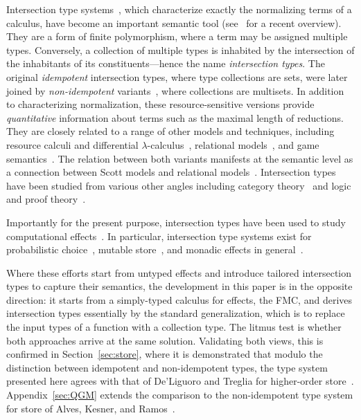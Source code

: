 \documentclass[a4paper,UKenglish,cleveref, autoref, thm-restate]{lipics-v2021}
\begin{document}
Intersection type systems~\cite{Coppo-Dezani-1980,Pottinger-1980}, which characterize exactly the normalizing terms of a calculus, have become an important semantic tool (see~\cite{Bono-Dezani-2020} for a recent overview). They are a form of finite polymorphism, where a term may be assigned multiple types. Conversely, a collection of multiple types is inhabited by the intersection of the inhabitants of its constituents---hence the name \emph{intersection types}. The original \emph{idempotent} intersection types, where type collections are sets, were later joined by \emph{non-idempotent} variants~\cite{Bucciarelli-Kesner-Ventura-2017,Kfoury-Wells-1999,Neergaard-Mairson-2004}, where collections are multisets. In addition to characterizing normalization, these resource-sensitive versions provide \emph{quantitative} information about terms such as the maximal length of reductions. They are closely related to a range of other models and techniques, including resource calculi and differential $\lambda$-calculus~\cite{Boudol-1993,Ehrhard-Regnier-2003,Kfoury-2000}, relational models~\cite{Laird-Manzonetto-McCusker-Pagani-2013,Paolini-Piccolo-Ronchi-2017}, and game semantics~\cite{Ong-2017}. The relation between both variants manifests at the semantic level as a connection between Scott models and relational models~\cite{Ehrhard-2012-CSL,Ehrhard-2012-TCS}. Intersection types have been studied from various other angles including category theory~\cite{Mazza-Pellissier-Vial-2018} and logic and proof theory~\cite{Ehrhard-2020,Guerrieri-Heijltjes-Paulus-2021,Pimentel-Ronchi-Roversi-2012}.

Importantly for the present purpose, intersection types have been used to study computational effects~\cite{Blaauwbroek-2017,Davies-Pfenning-2000,Dezani-Giannini-Ronchi-2009}. In particular, intersection type systems exist for probabilistic choice~\cite{Antonelli-DalLago-Pistone-2022,Breuvart-DalLago-2018}, mutable store~\cite{Alves-Kesner-Ramos-2023,deLiguoro-Treglia-2021,deLiguoro-Treglia-2023}, and monadic effects in general~\cite{Gavazzo-Treglia-Vanoni-2024}.

Where these efforts start from untyped effects and introduce tailored intersection types to capture their semantics, the development in this paper is in the opposite direction: it starts from a simply-typed calculus for effects, the FMC, and derives intersection types essentially by the standard generalization, which is to replace the input types of a function with a collection type. The litmus test is whether both approaches arrive at the same solution. Validating both views, this is confirmed in Section~\ref{sec:store}, where it is demonstrated that modulo the distinction between idempotent and non-idempotent types, the type system presented here agrees with that of De'Liguoro and Treglia for higher-order store~\cite{deLiguoro-Treglia-2021}. Appendix~\ref{sec:QGM} extends the comparison to the non-idempotent type system for store of Alves, Kesner, and Ramos~\cite{Alves-Kesner-Ramos-2023}.
\end{document}
